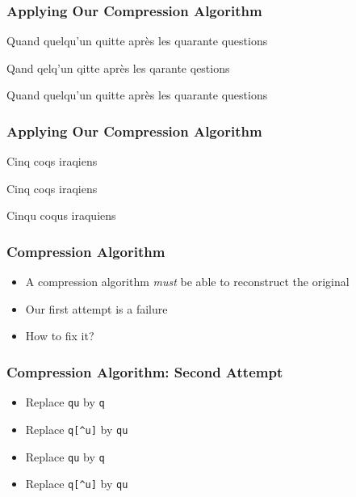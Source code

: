 \documentclass{../ucll-slides}
\begin{document}
\begin{frame}
  \frametitle{Applying Our Compression Algorithm}
  \begin{center}
    Quand quelqu'un quitte apr\`es les quarante questions
  \end{center}
  \vskip5mm
  \begin{center}
    Qand qelq'un qitte apr\`es les qarante qestions
  \end{center}
  \vskip5mm
  \begin{center}
    Quand quelqu'un quitte apr\`es les quarante questions
  \end{center}
  \begin{center}
  \end{center}
\end{frame}

\begin{frame}
  \frametitle{Applying Our Compression Algorithm}
  \begin{center}
    Cinq coqs iraqiens
  \end{center}
  \vskip5mm
  \begin{center}
    Cinq coqs iraqiens
  \end{center}
  \vskip5mm
  \begin{center}
    Cinqu coqus iraquiens
  \end{center}
  \begin{center}
  \end{center}
\end{frame}

\begin{frame}
  \frametitle{Compression Algorithm}
  \begin{itemize}
    \item A compression algorithm \emph{must} be able to
          reconstruct the original
    \item Our first attempt is a failure
    \item How to fix it?
  \end{itemize}
\end{frame}

\begin{frame}
  \frametitle{Compression Algorithm: Second Attempt}
  \begin{itemize}
    \item Replace {\tt qu} by {\tt q}
    \item Replace {\tt q[\^{}u]} by {\tt qu}
  \end{itemize}
  \vskip5mm
  \begin{itemize}
    \item Replace {\tt qu} by {\tt q}
    \item Replace {\tt q[\^{}u]} by {\tt qu}
  \end{itemize}
\end{frame}
\end{document}

